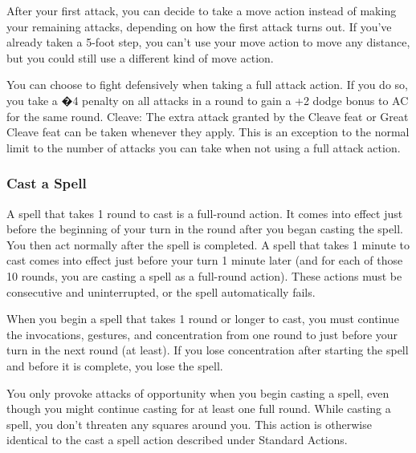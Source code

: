 After your first attack, you can decide to take a move action instead of making your remaining attacks, depending on how the first attack turns out. If you've already taken a 5-foot step, you can't use your move action to move any distance, but you could still use a different kind of move action.

You can choose to fight defensively when taking a full attack action. If you do so, you take a �4 penalty on all attacks in a round to gain a +2 dodge bonus to AC for the same round.
Cleave: The extra attack granted by the Cleave feat or Great Cleave feat can be taken whenever they apply. This is an exception to the normal limit to the number of attacks you can take when not using a full attack action.


\subsubsection{Cast a Spell}

A spell that takes 1 round to cast is a full-round action. It comes into effect just before the beginning of your turn in the round after you began casting the spell. You then act normally after the spell is completed.  A spell that takes 1 minute to cast comes into effect just before your turn 1 minute later (and for each of those 10 rounds, you are casting a spell as a full-round action). These actions must be consecutive and uninterrupted, or the spell automatically fails.

When you begin a spell that takes 1 round or longer to cast, you must continue the invocations, gestures, and concentration from one round to just before your turn in the next round (at least). If you lose concentration after starting the spell and before it is complete, you lose the spell.

You only provoke attacks of opportunity when you begin casting a spell, even though you might continue casting for at least one full round. While casting a spell, you don't threaten any squares around you. This action is otherwise identical to the cast a spell action described under Standard Actions.


